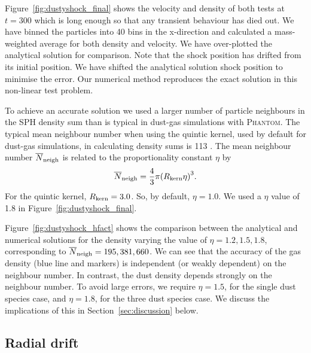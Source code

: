\documentclass[fleqn,usenatbib]{mnras}
\begin{document}
Figure~\ref{fig:dustyshock_final} shows the velocity and density of both tests
at \(t = 300\) which is long enough so that any transient behaviour has died
out. We have binned the particles into 40 bins in the x-direction and calculated
a mass-weighted average for both density and velocity. We have over-plotted the
analytical solution for comparison. Note that the shock position has drifted
from its initial position. We have shifted the analytical solution shock
position to minimise the error. Our numerical method reproduces the exact
solution in this non-linear test problem.

To achieve an accurate solution we used a larger number of particle neighbours
in the SPH density sum than is typical in dust-gas simulations with
\textsc{Phantom}. The typical mean neighbour number when using the quintic
kernel, used by default for dust-gas simulations, in calculating density sums is
113 \citep{Price2018PASA...35...31P}. The mean neighbour number
\(\overline{N}_{\rm neigh}\) is related to the proportionality constant \(\eta\)
by
%
\begin{align}
   \overline{N}_{\rm neigh} = \frac{4}{3} \pi
      {\left( R_{\rm kern} \eta \right)}^3.
\end{align}
%
For the quintic kernel, \( R_{\rm kern} = 3.0 \). So, by default, \(\eta =
1.0\). We used a \(\eta\) value of 1.8 in Figure~\ref{fig:dustyshock_final}.

Figure~\ref{fig:dustyshock_hfact} shows the comparison between the analytical
and numerical solutions for the density varying the value of \(\eta = 1.2, 1.5,
1.8\), corresponding to \(\overline{N}_{\rm neigh} = 195, 381, 660\). We can see
that the accuracy of the gas density (blue line and markers) is independent (or
weakly dependent) on the neighbour number. In contrast, the dust density depends
strongly on the neighbour number. To avoid large errors, we require \(\eta =
1.5\), for the single dust species case, and \(\eta = 1.8\), for the three dust
species case. We discuss the implications of this in
Section~\ref{sec:discussion} below.


\subsection{Radial drift}%
\label{subsec:radialdrift}
\end{document}
